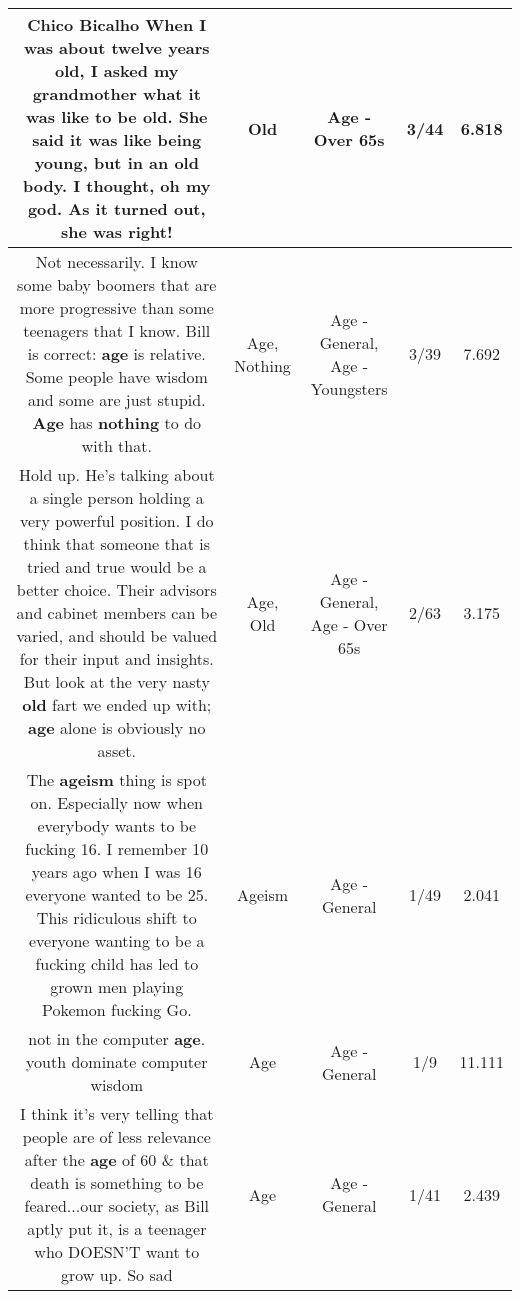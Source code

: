 \documentclass[11pt]{article}
\newlength\mylength
\begin{document}
\begin{center}
\begin{longtable}{|C{.65\mylength}|C{.30\mylength}|C{.12\mylength}|C{.12\mylength}|C{.12\mylength}|}
  \small Chico Bicalho   When I was about twelve years \textbf{old}, I asked my grandmother what it was like to be \textbf{old}.  She said it was like being young, but in an \textbf{old} body. I thought, oh my god.  As it turned out, she was right!\normalsize   & Old & Age - Over 65s & 3/44 & 6.818 \\  \hline
  \small Not necessarily. I know some baby boomers that are more progressive than some teenagers that I know. Bill is correct: \textbf{age} is relative. Some people have wisdom and some are just stupid. \textbf{Age} has \textbf{nothing} to do with that.\normalsize   & Age, Nothing & Age - General, Age - Youngsters & 3/39 & 7.692 \\  \hline
  \small Hold up. He's talking about a single person holding a very powerful position. I do think that someone that is tried and true would be a better choice. Their advisors and cabinet members can be varied, and should be valued for their input and insights. But look at the very nasty \textbf{old} fart we ended up with; \textbf{age} alone is obviously no asset.\normalsize   & Age, Old & Age - General, Age - Over 65s & 2/63 & 3.175 \\  \hline
  \small The \textbf{ageism} thing is spot on. Especially now when everybody wants to be fucking 16. I remember 10 years ago when I was 16 everyone wanted to be 25. This ridiculous shift to everyone wanting to be a fucking child has led to grown men playing Pokemon fucking Go.\normalsize   & Ageism & Age - General & 1/49 & 2.041 \\  \hline
  \small not in the computer \textbf{age}.  youth dominate computer wisdom\normalsize   & Age & Age - General & 1/9 & 11.111 \\  \hline
  \small I think it's very telling that people are of less relevance after the \textbf{age} of 60 \& that death is something to be feared...our society, as Bill aptly put it, is a teenager who DOESN'T want to grow up. So sad\normalsize   & Age & Age - General & 1/41 & 2.439 \\  \hline

\end{longtable}
\end{center}
\end{document}
